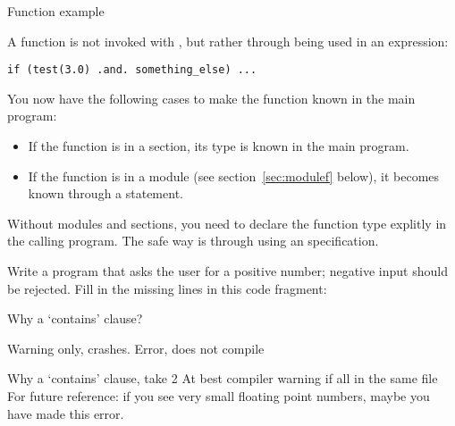 \begin{block}{Function example}
  \label{sl:ffunction-ex}
\end{block}

A function is not invoked with , but rather through being used
in an expression:
\begin{lstlisting}
if (test(3.0) .and. something_else) ...
\end{lstlisting}
You now have the following cases to make the function known in the
main program:
\begin{itemize}
\item If the function is in a  section, its type is known
  in the main program.
\item If the function is in a module (see section~\ref{sec:modulef}
  below), it becomes known through a  statement.
\end{itemize}

\begin{f77note}
  Without modules and  sections, you need to declare the
  function type explitly in the calling program. The safe way is
  through using an  specification.
\end{f77note}

\begin{exercise}
  \label{ex:freadpos}
  Write a program that asks the user for a positive number; negative
  input should be rejected.  Fill in the missing lines in this code
  fragment:
\end{exercise}

\begin{block}{Why a `contains' clause?}
  \label{sl:whycontain}
  \begin{multicols}{2}
    Warning only, crashes.
    \vfill\columnbreak
    Error, does not compile
  \end{multicols}
\end{block}

\begin{block}{Why a `contains' clause, take 2}
  \label{sl:whycontain_type}
  At best compiler warning if all in the same file\\
  For future reference: if you see very small floating point numbers,
  maybe you have made this error.
\end{block}


